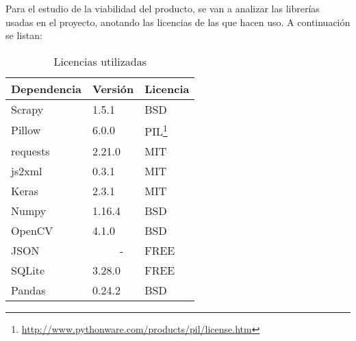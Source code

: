 Para el estudio de la viabilidad del producto, se van a analizar las librerías usadas en el proyecto, anotando las licencias de las que hacen uso. A continuación se listan:

\begin{savenotes}
\begin{table}[!h]
	\centering
	\begin{tabular}{l|l|l}
		\hline
		Dependencia & Versión & Licencia \\ \hline
		Scrapy & 1.5.1 & BSD \\
		Pillow & 6.0.0 & PIL\footnote{\url{http://www.pythonware.com/products/pil/license.htm}} \\
		requests & 2.21.0 & MIT \\
		js2xml & 0.3.1 & MIT \\
		Keras & 2.3.1 & MIT \\
		Numpy & 1.16.4 & BSD \\
		OpenCV & 4.1.0 & BSD \\
		JSON & \ \ \ \ \ - & FREE \\
		SQLite & 3.28.0 & FREE \\
		Pandas & 0.24.2 & BSD \\
		\bottomrule
	\end{tabular}
	\caption{Licencias utilizadas}
	\label{tab:licencias}
\end{table}
\end{savenotes}